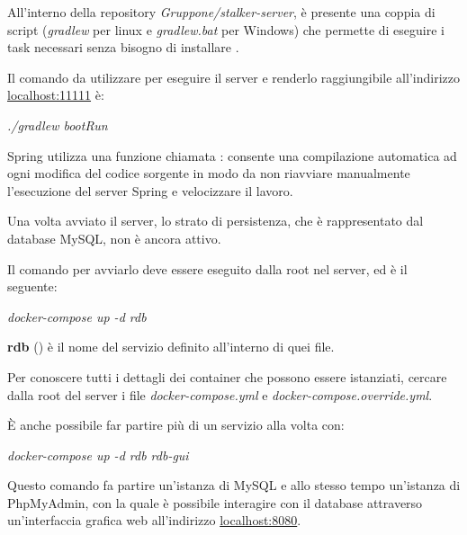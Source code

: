 \documentclass[../manuale-manutentore.tex]{subfiles}
\begin{document}
All'interno della repository \textit{Gruppone/stalker-server}, è presente una coppia di script (\textit{gradlew} per linux e \textit{gradlew.bat} per Windows) che permette di eseguire i task necessari senza bisogno di installare .

Il comando da utilizzare per eseguire il server e renderlo raggiungibile all'indirizzo \href{localhost:11111}{localhost:11111} è: \par\bigskip

\begin{center}
  \textit{./gradlew bootRun}
\end{center}
\par\bigskip

Spring utilizza una funzione chiamata : consente una compilazione automatica ad ogni modifica del codice sorgente in modo da non riavviare manualmente l'esecuzione del server Spring e velocizzare il lavoro.

Una volta avviato il server, lo strato di persistenza, che è rappresentato dal database MySQL, non è ancora attivo.

Il comando per avviarlo deve essere eseguito dalla root nel server, ed è il seguente: \par\bigskip

\begin{center}
  \textit{docker-compose up -d rdb}
\end{center}
\par\bigskip

\textbf{rdb} () è il nome del servizio definito all'interno di quei file.

Per conoscere tutti i dettagli dei container che possono essere istanziati, cercare dalla root del server i file \emph{docker-compose.yml} e \emph{docker-compose.override.yml}.

È anche possibile far partire più di un servizio alla volta con: \par\bigskip

\begin{center}
  \textit{docker-compose up -d rdb rdb-gui}
\end{center}

\par\bigskip

Questo comando fa partire un'istanza di MySQL e allo stesso tempo un'istanza di PhpMyAdmin, con la quale è possibile interagire con il database attraverso un'interfaccia grafica web all'indirizzo \href{localhost:8080}{localhost:8080}.
\end{document}
